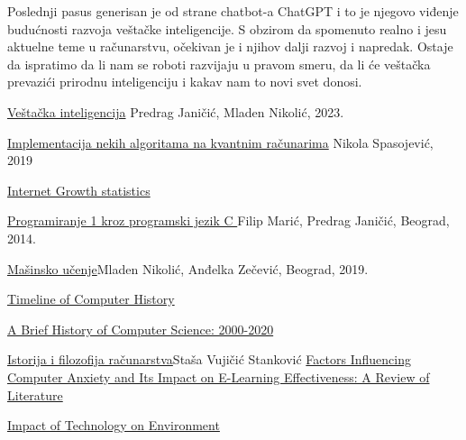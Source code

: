 \documentclass[a4paper]{article}
\begin{document}
{Poslednji pasus generisan je od strane chatbot-a ChatGPT i to je njegovo viđenje budućnosti razvoja veštačke inteligencije. S obzirom da spomenuto realno i jesu aktuelne teme u računarstvu, očekivan je i njihov dalji razvoj i napredak. Ostaje da ispratimo da li nam se roboti razvijaju u pravom smeru, da li će veštačka prevazići prirodnu inteligenciju i kakav nam to novi svet donosi.



\newpage
{}
\appendix  
% 


\begin{thebibliography}{Literatura}
        \href{http://poincare.matf.bg.ac.rs/~janicic//books/VI_B5.pdf}{Veštačka inteligencija}{ Predrag Janičić, Mladen Nikolić, 2023.}

        \href{http://www.racunarstvo.matf.bg.ac.rs/MasterRadovi/2017_06_05_Nikola_Spasojevic/rad.pdf}{Implementacija nekih algoritama na kvantnim računarima} {Nikola Spasojević, 2019}

        \href{https://www.internetworldstats.com/emarketing.htm}{Internet Growth statistics}

        \href{http://poincare.matf.bg.ac.rs/~sana/Programiranje1_M/p1_I_smer.pdf}{Programiranje 1 kroz programski jezik C }{
Filip Marić, Predrag Janičić, Beograd, 2014.}

        \href{https://ml.matf.bg.ac.rs/readings/ml.pdf}{Mašinsko učenje}{Mladen Nikolić, Anđelka Zečević, Beograd, 2019.}

        \href{https://www.computerhistory.org/timeline/}{Timeline of Computer History}

        \href{https://academicinfluence.com/inflection/study-guides/computer-science-2000-2020}{A Brief History of Computer Science: 2000-2020}
        
        \href{https://stasa.in.rs/wp-content/uploads/IFR-04.pdf}{Istorija i filozofija
računarstva}{Staša Vujičić Stanković}
        \href{https://files.eric.ed.gov/fulltext/ED501623.pdf}{Factors Influencing Computer Anxiety and Its Impact on E-Learning Effectiveness: A
Review of Literature }

        \href{http://ijesi.org/papers/Conf.1802(ICMEEP)/Vol-5/12.%2053-55.pdf}{Impact of Technology on Environment}


\end{thebibliography}}
\end{document}
